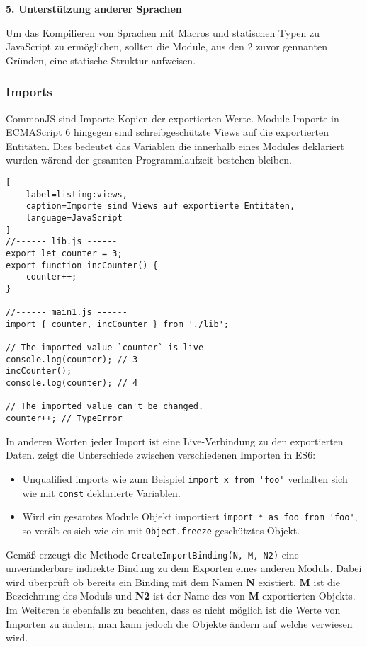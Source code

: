 \bigskip

\textbf{5. Unterstützung anderer Sprachen}

Um das Kompilieren von Sprachen mit Macros und statischen Typen zu JavaScript zu ermöglichen, sollten die Module, aus den 2 zuvor gennanten Gründen, eine statische Struktur aufweisen.

\subsubsection{Imports}
\label{subsubsection:importes}

CommonJS sind Importe Kopien der exportierten Werte. Module Importe in ECMAScript 6 hingegen sind schreibgeschützte Views auf die exportierten Entitäten. Dies bedeutet das Variablen die innerhalb eines Modules deklariert wurden wärend der gesamten Programmlaufzeit bestehen bleiben. \autocite{Rauschmayer2018}


\begin{lstlisting}[
    label=listing:views,
    caption=Importe sind Views auf exportierte Entitäten,
	language=JavaScript
]
//------ lib.js ------
export let counter = 3;
export function incCounter() {
    counter++;
}

//------ main1.js ------
import { counter, incCounter } from './lib';

// The imported value `counter` is live
console.log(counter); // 3
incCounter();
console.log(counter); // 4

// The imported value can't be changed.
counter++; // TypeError
\end{lstlisting}

In anderen Worten jeder Import ist eine Live-Verbindung zu den exportierten Daten. \textcite{Rauschmayer2018} zeigt die Unterschiede zwischen verschiedenen Importen in ES6:
\begin{itemize}
\item Unqualified imports wie zum Beispiel \lstinline{import x from 'foo'} verhalten sich wie mit \lstinline{const} deklarierte Variablen.
\item Wird ein gesamtes Module Objekt importiert \lstinline{import * as foo from 'foo'}, so verält es sich wie  ein mit \lstinline{Object.freeze} geschütztes Objekt.
\end{itemize}

Gemäß \textcite{ECMAScript} erzeugt die Methode \lstinline{CreateImportBinding(N, M, N2)} eine unveränderbare indirekte Bindung zu dem Exporten eines anderen Moduls. Dabei wird überprüft ob bereits ein Binding mit dem Namen \textbf{N} existiert. \textbf{M} ist die Bezeichnung des Moduls und \textbf{N2} ist der Name des von \textbf{M} exportierten Objekts.
Im Weiteren is ebenfalls zu beachten, dass es nicht möglich ist die Werte von Importen zu ändern, man kann jedoch die Objekte ändern auf welche verwiesen wird. \autocite{Rauschmayer2018}

